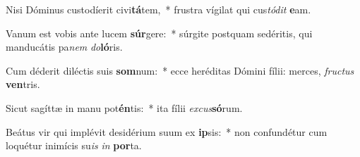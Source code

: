 \item Nisi Dóminus custodíerit civi\textbf{tá}tem,~* frustra vígilat qui cus\textit{tó}\textit{dit} \textbf{e}am.
\item Vanum est vobis ante lucem \textbf{súr}gere:~* súrgite postquam sedéritis, qui manducátis pa\textit{nem} \textit{do}\textbf{ló}ris.
\item Cum déderit diléctis suis \textbf{som}num:~* ecce heréditas Dómini fílii: merces, \textit{fruc}\textit{tus} \textbf{ven}tris.
\item Sicut sagíttæ in manu pot\textbf{én}tis:~* ita fílii \textit{ex}\textit{cus}\textbf{só}rum.
\item Beátus vir qui implévit desidérium suum ex \textbf{ip}sis:~* non confundétur cum loquétur inimícis su\textit{is} \textit{in} \textbf{por}ta.

